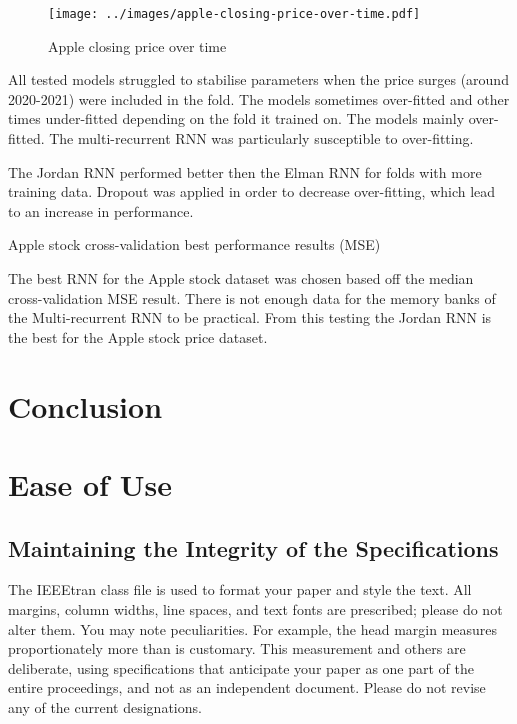 \documentclass[conference]{IEEEtran}
\begin{document}
\begin{figure}[htbp] 
	\centering
	\texttt{[image: ../images/apple-closing-price-over-time.pdf]}
	\caption{Apple closing price over time}
	\label{fig:apple-closing}
\end{figure}

All tested models struggled to stabilise parameters when the price surges (around 2020-2021) were included in the fold. The models sometimes over-fitted and other times under-fitted depending on the fold it trained on. The models mainly over-fitted. The multi-recurrent RNN was particularly susceptible to over-fitting.

The Jordan RNN performed better then the Elman RNN for folds with more training data. Dropout was applied in order to decrease over-fitting, which lead to an increase in performance. 

\begin{table}[htbp]
	\caption{Apple stock cross-validation best performance results (MSE)}
	\label{tab:apple-results}
\end{table}

The best RNN for the Apple stock dataset was chosen based off the median cross-validation MSE result. There is not enough data for the memory banks of the Multi-recurrent RNN to be practical. From this testing the Jordan RNN is the best for the Apple stock price dataset.

\section{Conclusion}

\section{Ease of Use}

\subsection{Maintaining the Integrity of the Specifications}

The IEEEtran class file is used to format your paper and style the text. All margins, 
column widths, line spaces, and text fonts are prescribed; please do not 
alter them. You may note peculiarities. For example, the head margin
measures proportionately more than is customary. This measurement 
and others are deliberate, using specifications that anticipate your paper 
as one part of the entire proceedings, and not as an independent document. 
Please do not revise any of the current designations.
\end{document}
